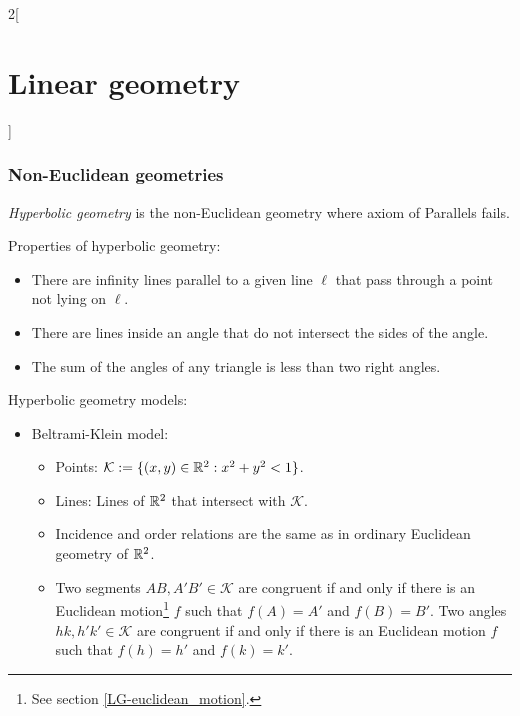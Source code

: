 \documentclass[../../../main.tex]{subfiles}
\begin{document}
\begin{multicols}{2}[\section{Linear geometry}]
  \subsubsection{Non-Euclidean geometries}
  \begin{definition}
    \textit{Hyperbolic geometry} is the non-Euclidean geometry where axiom of Parallels fails.
  \end{definition}
  \begin{prop}
    Properties of hyperbolic geometry:
    \begin{itemize}
      \item There are infinity lines parallel to a given line $\ell$ that pass through a point not lying on $\ell$.
      \item There are lines inside an angle that do not intersect the sides of the angle.
      \item The sum of the angles of any triangle is less than two right angles.
    \end{itemize}
  \end{prop}
  \begin{definition}
    Hyperbolic geometry models:
    \begin{itemize}
      \item Beltrami-Klein model:
            \begin{itemize}
              \item Points: $\mathcal{K}:=\{(x,y)\in\mathbb{R}^2:x^2+y^2<1\}$.
              \item Lines: Lines of $\mathbb{R}^2$ that intersect with $\mathcal{K}$.
              \item Incidence and order relations are the same as in ordinary Euclidean geometry of $\mathbb{R}^2$.
              \item Two segments $AB,A'B'\in\mathcal{K}$ are congruent if and only if there is an Euclidean motion\footnote{See section \ref{LG-euclidean_motion}.} $f$ such that $f(A)=A'$ and $f(B)=B'$. Two angles $hk,h'k'\in\mathcal{K}$ are congruent if and only if there is an Euclidean motion $f$ such that $f(h)=h'$ and $f(k)=k'$.
            \end{itemize}
            \begin{center}
              \begin{minipage}{\linewidth}
                \centering
                
              \end{minipage}

\end{center}
\end{itemize}
\end{definition}
\end{multicols}
\end{document}
